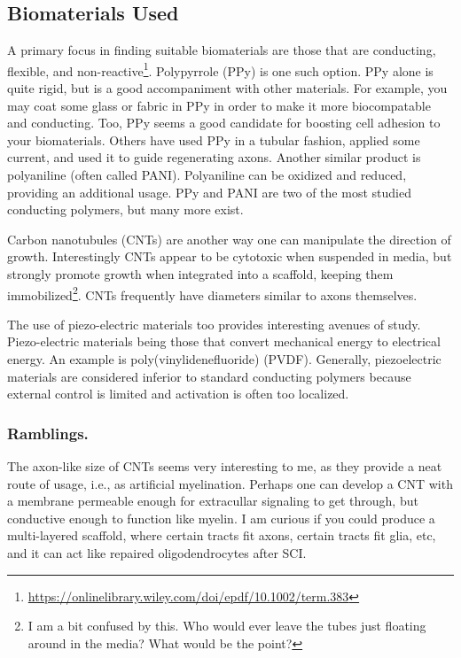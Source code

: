 \documentclass[12pt]{report}
\begin{document}
\subsection{Biomaterials Used}
A primary focus in finding suitable biomaterials are those that are conducting, flexible, and non-reactive\footnote{\url{https://onlinelibrary.wiley.com/doi/epdf/10.1002/term.383}}. Polypyrrole (PPy) is one such option. PPy alone is quite rigid, but is a good accompaniment with other materials. For example, you may coat some glass or fabric in PPy in order to make it more biocompatable and conducting. Too, PPy seems a good candidate for boosting cell adhesion to your biomaterials. Others have used PPy in a tubular fashion, applied some current, and used it to guide regenerating axons. Another similar product is polyaniline (often called PANI). Polyaniline can be oxidized and reduced, providing an additional usage. PPy and PANI are two of the most studied conducting polymers, but many more exist.\newline

Carbon nanotubules (CNTs) are another way one can manipulate the direction of growth. Interestingly CNTs appear to be cytotoxic when suspended in media, but strongly promote growth when integrated into a scaffold, keeping them immobilized\footnote{I am a bit confused by this. Who would ever leave the tubes just floating around in the media? What would be the point?}. CNTs frequently have diameters similar to axons themselves.\newline

The use of piezo-electric materials too provides interesting avenues of study. Piezo-electric materials being those that convert mechanical energy to electrical energy. An example is poly(vinylidenefluoride) (PVDF). Generally, piezoelectric materials are considered inferior to standard conducting polymers because external control is limited and activation is often too localized. 

\subsubsection{Ramblings.}
The axon-like size of CNTs seems very interesting to me, as they provide a neat route of usage, i.e., as artificial myelination. Perhaps one can develop a CNT with a membrane permeable enough for extracullar signaling to get through, but conductive enough to function like myelin. I am curious if you could produce a multi-layered scaffold, where certain tracts fit axons, certain tracts fit glia, etc, and it can act like repaired oligodendrocytes after SCI.\newline
\end{document}
